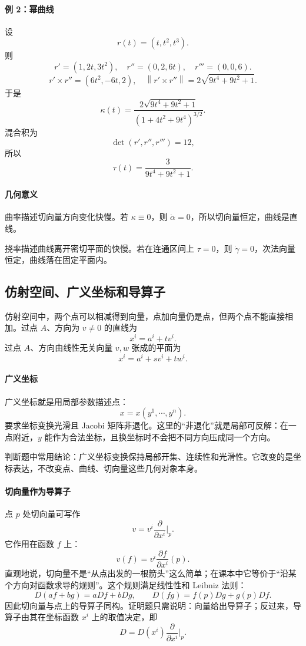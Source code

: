 \documentclass[UTF8,12pt,a4paper]{ctexart}
\newcommand{\norm}[1]{\left\lVert #1\right\rVert}
\begin{document}
\paragraph{例 2：幂曲线}
设
\[
r(t)=(t,t^2,t^3).
\]
则
\[
r'=(1,2t,3t^2),\quad r''=(0,2,6t),\quad r'''=(0,0,6).
\]
\[
r'\times r''=(6t^2,-6t,2),
\quad
\norm{r'\times r''}=2\sqrt{9t^4+9t^2+1}.
\]
于是
\[
\kappa(t)=
\frac{2\sqrt{9t^4+9t^2+1}}
{(1+4t^2+9t^4)^{3/2}}.
\]
混合积为
\[
\det(r',r'',r''')=12,
\]
所以
\[
\tau(t)=
\frac{3}{9t^4+9t^2+1}.
\]

\paragraph{几何意义}
曲率描述切向量方向变化快慢。若 $\kappa\equiv0$，则 $\dot\alpha=0$，所以切向量恒定，曲线是直线。

挠率描述曲线离开密切平面的快慢。若在连通区间上 $\tau=0$，则 $\dot\gamma=0$，次法向量恒定，曲线落在固定平面内。

\subsection{仿射空间、广义坐标和导算子}

仿射空间中，两个点可以相减得到向量，点加向量仍是点，但两个点不能直接相加。过点 $A$、方向为 $v\ne0$ 的直线为
\[
x^i=a^i+tv^i.
\]
过点 $A$、方向由线性无关向量 $v,w$ 张成的平面为
\[
x^i=a^i+sv^i+tw^i.
\]

\paragraph{广义坐标}
广义坐标就是用局部参数描述点：
\[
x=x(y^1,\cdots,y^n).
\]
要求坐标变换光滑且 Jacobi 矩阵非退化。这里的“非退化”就是局部可反解：在一点附近，$y$ 能作为合法坐标，且换坐标时不会把不同方向压成同一个方向。

判断题中常用结论：广义坐标变换保持局部开集、连续性和光滑性。它改变的是坐标表达，不改变点、曲线、切向量这些几何对象本身。

\paragraph{切向量作为导算子}
点 $p$ 处切向量可写作
\[
v=v^i\frac{\partial}{\partial x^i}\bigg|_p.
\]
它作用在函数 $f$ 上：
\[
v(f)=v^i\frac{\partial f}{\partial x^i}(p).
\]
直观地说，切向量不是“从点出发的一根箭头”这么简单；在课本中它等价于“沿某个方向对函数求导的规则”。这个规则满足线性性和 Leibniz 法则：
\[
D(af+bg)=aDf+bDg,\qquad D(fg)=f(p)Dg+g(p)Df.
\]
因此切向量与点上的导算子同构。证明题只需说明：向量给出导算子；反过来，导算子由其在坐标函数 $x^i$ 上的取值决定，即
\[
D=D(x^i)\frac{\partial}{\partial x^i}\bigg|_p.
\]
\end{document}
